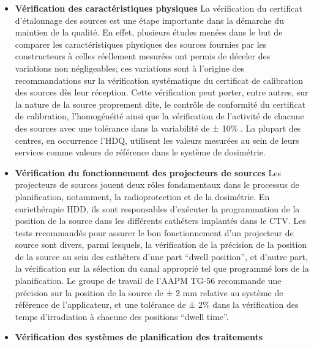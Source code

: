 \begin{itemize}[label=\textbullet, font=\LARGE]
\item \textbf{Vérification des caractéristiques physiques}\newline
La vérification du certificat d’étalonnage des sources est une étape importante dans la démarche du maintien de la qualité. En effet, plusieurs études menées dans le but de comparer les caractéristiques physiques des sources fournies par les constructeurs à celles réellement mesurées ont permis de déceler des variations non négligeables; ces variations sont à l’origine des recommandations sur la vérification systématique du certificat de calibration des sources dès leur réception\cite{Baltas@1999, Elfrink@2002, Venselaar@1995}. Cette vérification peut porter, entre autres, sur la nature de la source proprement dite, le contrôle de conformité du certificat de calibration, l’homogénéité ainsi que la vérification de l’activité de chacune des sources avec une tolérance dans la variabilité de ± 10\% \cite{HaieMeder@2002}. La plupart des centres, en occurrence l’HDQ, utilisent les valeurs mesurées au sein de leurs services comme valeurs de référence dans le système de dosimétrie.
\\
%
\item \textbf{Vérification du fonctionnement des projecteurs de sources }\newline
Les projecteurs de sources jouent deux rôles fondamentaux dans le processus de planification, notamment, la radioprotection et de la dosimétrie. En curiethérapie HDD, ils sont responsables d’exécuter la programmation de la position de la source dans les différents cathéters implantés dans le CTV. Les tests recommandés pour assurer le bon fonctionnement d’un projecteur de source sont divers, parmi lesquels, la vérification de la précision de la position de la source au sein des cathéters d’une part \enquote{dwell position}, et d’autre part, la vérification sur la sélection du canal approprié tel que programmé lors de la planification. Le groupe de travail de l’AAPM TG-56 \cite{Nath@1997} recommande une précision sur la position de la source de ± 2 mm relative au système de référence de l’applicateur, et une tolérance de ± 2\% dans la vérification des temps d’irradiation à chacune des positions \enquote{dwell time}.
%
\item \textbf{Vérification des systèmes de planification des traitements}\newline

\end{itemize}
